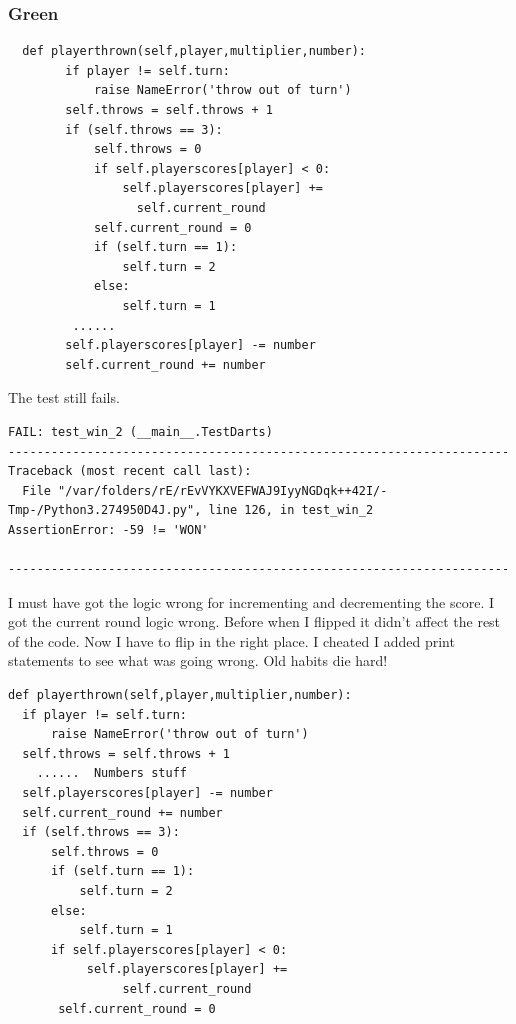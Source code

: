 \documentclass{beamer}
\begin{document}
\begin{frame}[fragile]
\frametitle{Green}
\begin{lstlisting}
  def playerthrown(self,player,multiplier,number):
        if player != self.turn:
            raise NameError('throw out of turn')
        self.throws = self.throws + 1
        if (self.throws == 3):
            self.throws = 0
            if self.playerscores[player] < 0:
                self.playerscores[player] += 
                  self.current_round                
            self.current_round = 0
            if (self.turn == 1):
                self.turn = 2
            else:
                self.turn = 1
         ...... 
        self.playerscores[player] -= number
        self.current_round += number
\end{lstlisting}
  
\end{frame}
\begin{frame}[fragile]
The test still fails.
\begin{verbatim}
FAIL: test_win_2 (__main__.TestDarts)
----------------------------------------------------------------------
Traceback (most recent call last):
  File "/var/folders/rE/rEvVYKXVEFWAJ9IyyNGDqk++42I/-Tmp-/Python3.274950D4J.py", line 126, in test_win_2
AssertionError: -59 != 'WON'

----------------------------------------------------------------------
\end{verbatim}
  
 I must have got the logic wrong for incrementing and decrementing the
score. I got the current round logic wrong. Before when I flipped it didn't
affect the rest of the code. Now I have to flip in the right place.
I cheated I added print statements to see what was going wrong. Old
habits die hard!
\end{frame}
\begin{frame}[fragile]
\begin{lstlisting}
def playerthrown(self,player,multiplier,number):
  if player != self.turn:
      raise NameError('throw out of turn')
  self.throws = self.throws + 1
    ......  Numbers stuff
  self.playerscores[player] -= number
  self.current_round += number
  if (self.throws == 3):
      self.throws = 0
      if (self.turn == 1):
          self.turn = 2
      else:
          self.turn = 1
      if self.playerscores[player] < 0:
           self.playerscores[player] +=
                self.current_round
       self.current_round = 0
\end{lstlisting}
\end{frame}
\end{document}
